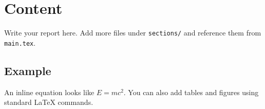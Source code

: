 \section{Content}

Write your report here. Add more files under \texttt{sections/} and reference them from \texttt{main.tex}.

\subsection{Example}

An inline equation looks like $E = mc^2$. You can also add tables and figures using standard LaTeX commands.
